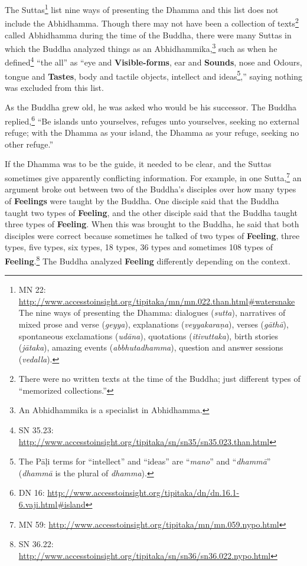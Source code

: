 The Suttas\footnote{MN 22: \url{http://www.accesstoinsight.org/tipitaka/mn/mn.022.than.html\#watersnake}\\The nine ways of presenting the Dhamma: dialogues (\textit{sutta}), narratives of mixed prose and verse (\textit{geyya}), explanations (\textit{veyyakaraṇa}), verses (\textit{gāthā}), spontaneous exclamations (\textit{udāna}), quotations (\textit{itivuttaka}), birth stories (\textit{jātaka}), amazing events (\textit{abbhutadhamma}), question and answer sessions (\textit{vedalla}).} list nine ways of presenting the Dhamma and this list does not include the Abhidhamma. Though there may not have been a collection of texts\footnote{There were no written texts at the time of the Buddha; just different types of “memorized collections.”} called Abhidhamma during the time of the Buddha, there were many Suttas in which the Buddha analyzed things as an Abhidhammika,\footnote{An Abhidhammika is a specialist in Abhidhamma.} such as when he defined\footnote{SN 35.23: \url{http://www.accesstoinsight.org/tipitaka/sn/sn35/sn35.023.than.html}} “the all” as “eye and \textbf{Visible-forms}, ear and \textbf{Sounds}, nose and Odours, tongue and \textbf{Tastes}, body and tactile objects, intellect and ideas\footnote{The Pāḷi terms for “intellect” and “ideas” are “\textit{mano}” and “\textit{dhammā}” (\textit{dhammā} is the plural of \textit{dhamma}).},” saying nothing was excluded from this list. 

As the Buddha grew old, he was asked who would be his successor. The Buddha replied,\footnote{DN 16: \url{http://www.accesstoinsight.org/tipitaka/dn/dn.16.1-6.vaji.html\#island}} “Be islands unto yourselves, refuges unto yourselves, seeking no external refuge; with the Dhamma as your island, the Dhamma as your refuge, seeking no other refuge.”

If the Dhamma was to be the guide, it needed to be clear, and the Suttas sometimes give apparently conflicting information. For example, in one Sutta,\footnote{MN 59: \url{http://www.accesstoinsight.org/tipitaka/mn/mn.059.nypo.html}} an argument broke out between two of the Buddha’s disciples over how many types of \textbf{Feelings} were taught by the Buddha. One disciple said that the Buddha taught two types of \textbf{Feeling}, and the other disciple said that the Buddha taught three types of \textbf{Feeling}. When this was brought to the Buddha, he said that both disciples were correct because sometimes he talked of two types of \textbf{Feeling}, three types, five types, six types, 18 types, 36 types and sometimes 108 types of \textbf{Feeling}.\footnote{SN 36.22: \url{http://www.accesstoinsight.org/tipitaka/sn/sn36/sn36.022.nypo.html}} The Buddha analyzed \textbf{Feeling} differently depending on the context.

